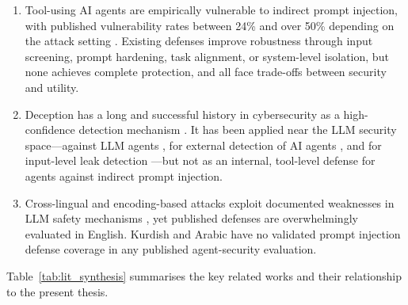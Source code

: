 \begin{enumerate}
  \item Tool-using AI agents are empirically vulnerable to indirect prompt injection, with published vulnerability rates between 24\% and over 50\% depending on the attack setting \citep{zhan2024injecagent, aisafety2025international}.  Existing defenses improve robustness through input screening, prompt hardening, task alignment, or system-level isolation, but none achieves complete protection, and all face trade-offs between security and utility.
  \item Deception has a long and successful history in cybersecurity as a high-confidence detection mechanism \citep{spitzner2003honeypots}.  It has been applied near the LLM security space---against LLM agents \citep{ayzenshteyn2025cloak}, for external detection of AI agents \citep{reworr2024llm}, and for input-level leak detection \citep{protectai2023rebuff}---but not as an internal, tool-level defense for agents against indirect prompt injection.
  \item Cross-lingual and encoding-based attacks exploit documented weaknesses in LLM safety mechanisms \citep{deng2024multilingual, alghanim2024jailbreaking, boucher2022bad}, yet published defenses are overwhelmingly evaluated in English.  Kurdish and Arabic have no validated prompt injection defense coverage in any published agent-security evaluation.
\end{enumerate}

\begin{justify}
\noindent Table~\ref{tab:lit_synthesis} summarises the key related works and their relationship to the present thesis.
\end{justify}

